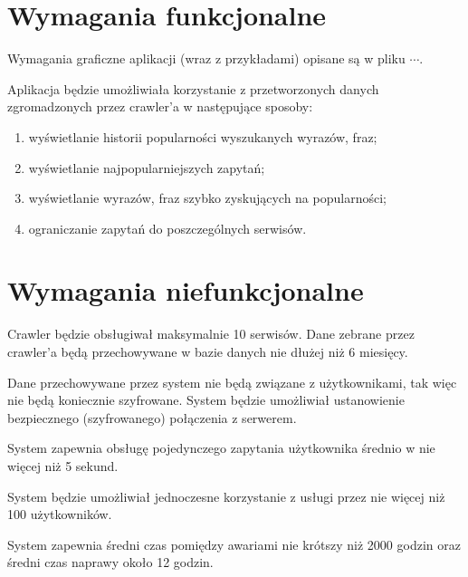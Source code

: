 \documentclass[a4paper]{scrreprt}
\begin{document}
\section*{Wymagania funkcjonalne}
Wymagania graficzne aplikacji (wraz z przykładami) opisane są w pliku \href{}{$\cdots$}.

Aplikacja będzie umożliwiała korzystanie z przetworzonych danych zgromadzonych przez crawler'a w następujące sposoby:
\begin{enumerate}
	\itemsep-0.1cm
	\item wyświetlanie historii popularności wyszukanych wyrazów, fraz;
	\item wyświetlanie najpopularniejszych zapytań;
	\item wyświetlanie wyrazów, fraz szybko zyskujących na popularności;
	\item ograniczanie zapytań do poszczególnych serwisów.
\end{enumerate}

\section*{Wymagania niefunkcjonalne}
Crawler będzie obsługiwał maksymalnie 10 serwisów. Dane zebrane przez crawler'a będą przechowywane w bazie danych nie dłużej niż 6 miesięcy.

Dane przechowywane przez system nie będą związane z użytkownikami, tak więc nie będą koniecznie szyfrowane. System będzie umożliwiał ustanowienie bezpiecznego (szyfrowanego) połączenia z serwerem.

System zapewnia obsługę pojedynczego zapytania użytkownika średnio w nie więcej niż 5 sekund.

System będzie umożliwiał jednoczesne korzystanie z usługi przez nie więcej niż 100 użytkowników.

System zapewnia średni czas pomiędzy awariami nie krótszy niż 2000 godzin oraz średni czas naprawy około 12 godzin.
\end{document}
